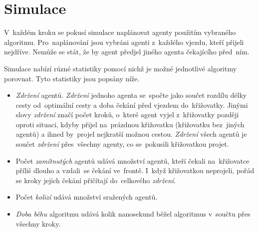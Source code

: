 \section{Simulace}\label{sec:simulace}

V~každém kroku se pokusí simulace naplánovat agenty použitím vybraného algoritmu.
Pro~naplánování jsou vybráni agenti z~každého vjezdu, kteří přijeli nejdříve.
Nemůže se stát, že by agent předjel jiného agenta čekajícího před~ním.

Simulace nabízí různé statistiky pomocí nichž je možné jednotlivé algoritmy porovnat.
Tyto statistiky jsou popsány níže.

\begin{itemize}
	\item \emph{Zdržení} agentů. \emph{Zdržení} jednoho agenta se~spočte jako součet
	rozdílu délky cesty od~optimální cesty a doba čekání před vjezdem do~křižovatky.
	Jinými slovy \emph{zdržení} značí počet kroků, o~které agent vyjel z~křižovatky později oproti situaci,
	kdyby přijel na~prázdnou křižovatku (křižovatku bez~jiných agentů) a ihned by~projel nejkratší možnou cestou.
	\emph{Zdržení} všech agentů je součet \emph{zdržení} přes~všechny agenty, co se~pokusili křižovatkou projet.
	\item Počet \emph{zamítnutých} agentů udává množství agentů, kteří čekali na~křižovatce příliš dlouho a
	vzdali~se čekání ve~frontě.
	I~když křižovatkou neprojeli, pořád se kroky jejich čekání přičítají do~celkového \emph{zdržení}.
	\item Počet \emph{kolizí} udává množství sražených agentů.
	\item \emph{Doba běhu} algoritmu udává kolik nanosekund běžel algoritmus v~součtu přes všechny kroky.
\end{itemize}
